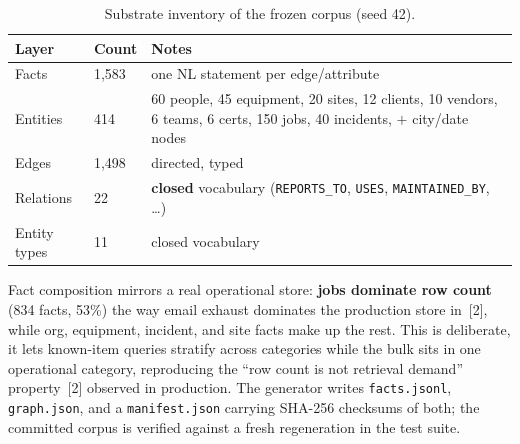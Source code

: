 \documentclass[11pt]{article}
\begin{document}
\begin{table}[h]\centering\small
\begin{tabular}{llp{7.6cm}}
\toprule
Layer & Count & Notes \\
\midrule
Facts & 1{,}583 & one NL statement per edge/attribute \\
Entities & 414 & 60 people, 45 equipment, 20 sites, 12 clients, 10 vendors, 6 teams, 6 certs, 150 jobs, 40 incidents, $+$ city/date nodes \\
Edges & 1{,}498 & directed, typed \\
Relations & 22 & \textbf{closed} vocabulary (\texttt{REPORTS\_TO}, \texttt{USES}, \texttt{MAINTAINED\_BY}, \dots) \\
Entity types & 11 & closed vocabulary \\
\bottomrule
\end{tabular}
\caption{Substrate inventory of the frozen corpus (seed 42).}
\end{table}

Fact composition mirrors a real operational store: \textbf{jobs dominate row count}
(834 facts, 53\%) the way email exhaust dominates the production store in~[2], while org,
equipment, incident, and site facts make up the rest. This is deliberate, it lets
known-item queries stratify across categories while the bulk sits in one operational
category, reproducing the ``row count is not retrieval demand'' property~[2] observed in
production. The generator writes \texttt{facts.jsonl}, \texttt{graph.json}, and a
\texttt{manifest.json} carrying SHA-256 checksums of both; the committed corpus is verified
against a fresh regeneration in the test suite.
\end{document}
